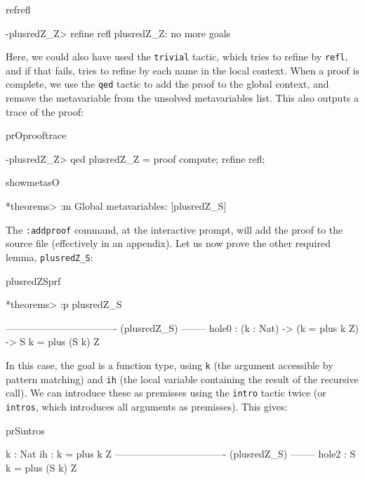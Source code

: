 \begin{SaveVerbatim}{refrefl}

-plusredZ_Z> refine refl
plusredZ_Z: no more goals

\end{SaveVerbatim}

\noindent
Here, we could also have used the \texttt{trivial} tactic, which tries to refine by
\texttt{refl}, and if that fails, tries to refine by each name in the local context.
When a proof is complete, we use the \texttt{qed} tactic to add the proof to the
global context, and remove the metavariable from the unsolved metavariables list.
This also outputs a trace of the proof:

\begin{SaveVerbatim}{prOprooftrace}

-plusredZ_Z> qed
plusredZ_Z = proof {
    compute;
    refine refl;
}

\end{SaveVerbatim}

\begin{SaveVerbatim}{showmetasO}

*theorems> :m 
Global metavariables:
        [plusredZ_S]

\end{SaveVerbatim}

\noindent
The \texttt{:addproof} command, at the interactive prompt, will add the proof to
the source file (effectively in an appendix).
Let us now prove the other required lemma, \texttt{plusredZ\_S}:

\begin{SaveVerbatim}{plusredZSprf}

*theorems> :p plusredZ_S

---------------------------------- (plusredZ_S) --------
{hole0} : (k : Nat) -> (k = plus k Z) -> S k = plus (S k) Z

\end{SaveVerbatim}

\noindent
In this case, the goal is a function type, using \texttt{k} (the argument accessible by
pattern matching) and \texttt{ih} (the local variable containing the result of
the recursive call). We can introduce these as premisses using the \texttt{intro} tactic
twice (or \texttt{intros}, which introduces all arguments as premisses). This gives:

\begin{SaveVerbatim}{prSintros}

  k : Nat
  ih : k = plus k Z
---------------------------------- (plusredZ_S) --------
{hole2} : S k = plus (S k) Z

\end{SaveVerbatim}

